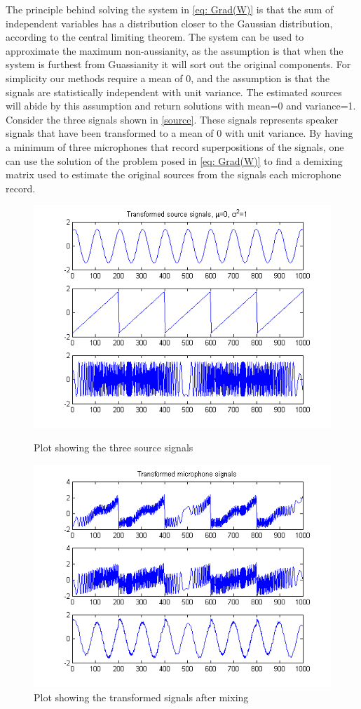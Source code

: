 The principle behind solving the system in \cref{eq: Grad(W)} is that the sum of independent variables has a distribution closer to the Gaussian distribution, according to the central limiting theorem. The system can be used to approximate the maximum non-aussianity, as the assumption is that when the system is furthest from Guassianity it will sort out the original components. For simplicity our methods require a mean of 0, and the assumption is that the signals are statistically independent with unit variance. The estimated sources will abide by this assumption and return solutions with mean=0 and variance=1.
Consider the three signals shown in \cref{source}. 
These signals represents speaker signals that have been transformed to a mean of 0 with unit variance. 
By having a minimum of three microphones that record superpositions of the signals, one can use the solution of the problem posed in \cref{eq: Grad(W)} to find a demixing matrix used to estimate the original sources from the signals each microphone record.

\begin{figure}[!htbp]
\includegraphics[scale=0.83]{transformedsourcesignals.png}
\caption{Plot showing the three source signals}
\label{source}

\includegraphics[scale=0.83]{transformedmicsignals.png}
\caption{Plot showing the transformed signals after mixing}
\label{mic}
\end{figure}

